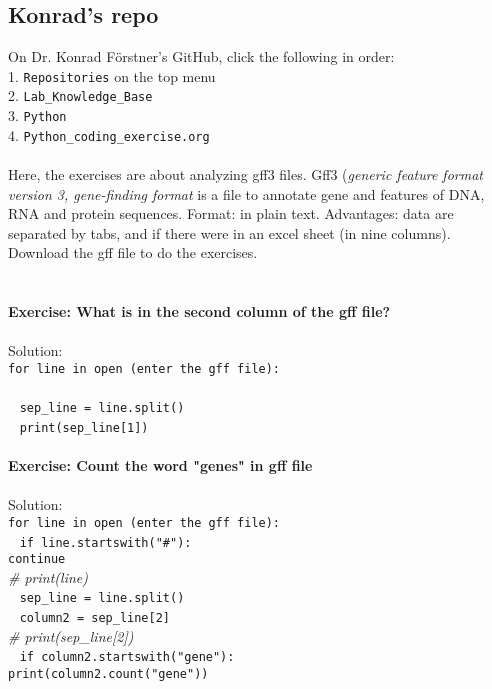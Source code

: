 \documentclass{article}
\begin{document}
{{{\subsection{Konrad's repo}
On Dr. Konrad F\"orstner's GitHub, click the following in order:\\
1. \texttt{Repositories} on the top menu\\
2. \texttt{Lab\_Knowledge\_Base}\\
3. \texttt{Python}\\
4. \texttt{Python\_coding\_exercise.org}\\
\\
Here, the exercises are about analyzing gff3 files. Gff3 (\textit{generic feature format version 3, gene-finding format} is a file to annotate gene and features of DNA, RNA and protein sequences. Format: in plain text. Advantages: data are separated by tabs, and if there were in an excel sheet (in nine columns). Download the gff file to do the exercises.\\ 
\\
\\
\textbf{Exercise: What is in the second column of the gff file?}\\
\\
Solution:\\
\texttt{for line in open (enter the gff file):}\\
\\
\indent ~ \texttt{sep\_line = line.split()}\\
\indent ~ \texttt{print(sep\_line[1])}\\
\\
\textbf{Exercise: Count the word "genes" in gff file}\\
\\
Solution:\\
\texttt{for line in open (enter the gff file):}\\
\indent ~ \texttt{if line.startswith("\#"):}\\
\indent \indent \texttt{continue}\\
\indent \indent \textit{\# print(line)}\\
\indent ~ \texttt{sep\_line = line.split()}\\
\indent ~ \texttt{column2 = sep\_line[2]}\\
\indent \indent \textit{\# print(sep\_line[2])}\\
\indent ~ \texttt{if column2.startswith("gene"):}\\
\indent \indent \texttt{print(column2.count("gene"))}\\
}}}
\end{document}
